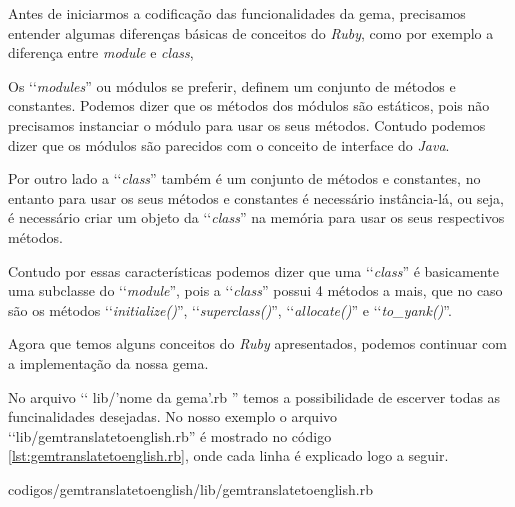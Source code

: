 Antes de iniciarmos a codificação das funcionalidades da gema, precisamos entender algumas diferenças
básicas de conceitos do \emph{Ruby}, como por exemplo a diferença entre \emph{module} e \emph{class},

Os ‘‘\emph{modules}'' ou módulos se preferir, definem um conjunto de métodos e constantes. Podemos
dizer que os métodos dos módulos são estáticos, pois não precisamos instanciar o módulo para usar os
seus métodos. Contudo podemos dizer que os módulos são parecidos com o conceito de interface do
\emph{Java}.

Por outro lado a ‘‘\emph{class}'' também é um conjunto de métodos e constantes, no
entanto para usar os seus métodos e constantes é necessário instância-lá, ou seja, é necessário criar
um objeto da ‘‘\emph{class}'' na memória para usar os seus respectivos métodos.

Contudo por essas características podemos dizer que uma ‘‘\emph{class}'' é basicamente
uma subclasse do ‘‘\emph{module}'', pois a ‘‘\emph{class}'' possui 4 métodos a mais, que no caso são
os métodos ‘‘\emph{initialize()}'', ‘‘\emph{superclass()}'', ‘‘\emph{allocate()}'' e ‘‘\emph{to\_yank()}''.

Agora que temos alguns conceitos do \emph{Ruby} apresentados, podemos continuar com a implementação
da nossa gema.

No arquivo ‘‘ lib/'nome da gema'.rb '' temos a possibilidade de escerver todas as
funcinalidades desejadas. No nosso exemplo o arquivo ‘‘lib/gemtranslatetoenglish.rb'' é mostrado no código
\ref{lst:gemtranslatetoenglish.rb}, onde cada linha é explicado
logo a seguir.


{codigos/gemtranslatetoenglish/lib/gemtranslatetoenglish.rb}

